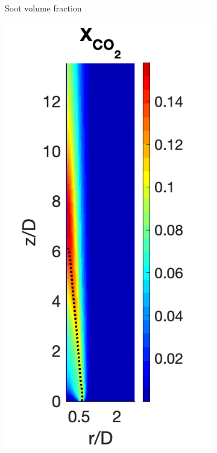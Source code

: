 \documentclass[12pt]{CHT-20}
\begin{document}
\begin{figure}[H]
\begin{subfigure}[b]{0.25\textwidth}
         \caption{Soot volume fraction}
     \end{subfigure}
     \begin{subfigure}[b]{0.245\textwidth}
         \centering
         \includegraphics[width=\textwidth]{figures/santoro/CO2Contour.png}

\end{subfigure}
\end{figure}
\end{document}
